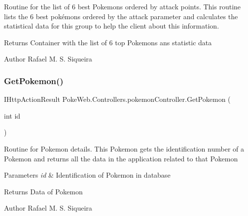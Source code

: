 Routine for the list of 6 best Pokemons ordered by attack points. This routine lists the 6 best pokémons ordered by the attack parameter and calculates the statistical data for this group to help the client about this information.

\begin{DoxyReturn}{Returns}
Container with the list of 6 top Pokemons ans statistic data 
\end{DoxyReturn}
\begin{DoxyAuthor}{Author}
Rafael M. S. Siqueira 
\end{DoxyAuthor}
\mbox{\label{class_poke_web_1_1_controllers_1_1pokemon_controller_a31ee4aa642842e5fb9a2c1ceaf42f0b6}} 
\subsubsection{\texorpdfstring{Get\+Pokemon()}{GetPokemon()}}
{\footnotesize\ttfamily I\+Http\+Action\+Result Poke\+Web.\+Controllers.\+pokemon\+Controller.\+Get\+Pokemon (\begin{DoxyParamCaption}\item[{int}]{id }\end{DoxyParamCaption})\hspace{0.3cm}{\ttfamily [inline]}}

Routine for Pokemon details. This Pokemon gets the identification number of a Pokemon and returns all the data in the application related to that Pokemon


\begin{DoxyParams}{Parameters}
{\em id} & Identification of Pokemon in database \\
\hline
\end{DoxyParams}
\begin{DoxyReturn}{Returns}
Data of Pokemon 
\end{DoxyReturn}
\begin{DoxyAuthor}{Author}
Rafael M. S. Siqueira 
\end{DoxyAuthor}
\mbox{\label{class_poke_web_1_1_controllers_1_1pokemon_controller_a563cc501f839af2bf76b57b8a8c26dd0}} 
